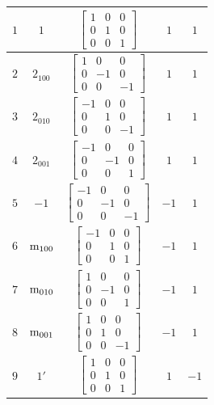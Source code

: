 \documentclass[fleqn,8pt]{jsarticle}
\begin{document}
\begin{longtable}{ccccc}
$ 1 $ & $ 1 $ & $ \begin{bmatrix} 1 & 0 & 0 \\ 0 & 1 & 0 \\ 0 & 0 & 1 \end{bmatrix} $ & $ 1 $ & $ 1 $ \\ \hline
$ 2 $ & $ 2{}_{100} $ & $ \begin{bmatrix} 1 & 0 & 0 \\ 0 & -1 & 0 \\ 0 & 0 & -1 \end{bmatrix} $ & $ 1 $ & $ 1 $ \\ \hline
$ 3 $ & $ 2{}_{010} $ & $ \begin{bmatrix} -1 & 0 & 0 \\ 0 & 1 & 0 \\ 0 & 0 & -1 \end{bmatrix} $ & $ 1 $ & $ 1 $ \\ \hline
$ 4 $ & $ 2{}_{001} $ & $ \begin{bmatrix} -1 & 0 & 0 \\ 0 & -1 & 0 \\ 0 & 0 & 1 \end{bmatrix} $ & $ 1 $ & $ 1 $ \\ \hline
$ 5 $ & $ -1 $ & $ \begin{bmatrix} -1 & 0 & 0 \\ 0 & -1 & 0 \\ 0 & 0 & -1 \end{bmatrix} $ & $ -1 $ & $ 1 $ \\ \hline
$ 6 $ & $ {\rm m}_{100} $ & $ \begin{bmatrix} -1 & 0 & 0 \\ 0 & 1 & 0 \\ 0 & 0 & 1 \end{bmatrix} $ & $ -1 $ & $ 1 $ \\ \hline
$ 7 $ & $ {\rm m}_{010} $ & $ \begin{bmatrix} 1 & 0 & 0 \\ 0 & -1 & 0 \\ 0 & 0 & 1 \end{bmatrix} $ & $ -1 $ & $ 1 $ \\ \hline
$ 8 $ & $ {\rm m}_{001} $ & $ \begin{bmatrix} 1 & 0 & 0 \\ 0 & 1 & 0 \\ 0 & 0 & -1 \end{bmatrix} $ & $ -1 $ & $ 1 $ \\ \hline
$ 9 $ & $ 1{}' $ & $ \begin{bmatrix} 1 & 0 & 0 \\ 0 & 1 & 0 \\ 0 & 0 & 1 \end{bmatrix} $ & $ 1 $ & $ -1 $ \\ \hline

\end{longtable}
\end{document}
